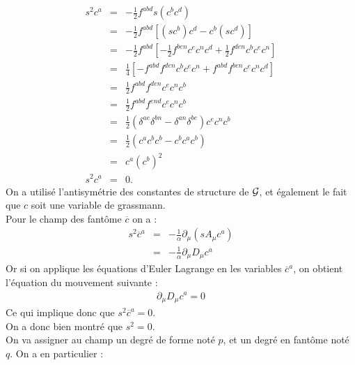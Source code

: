 \documentclass[a4paper,11pt]{article} %
\theoremstyle{plain}
\theoremstyle{definition}
\theoremstyle{remark}
\numberwithin{equation}{section}
\numberwithin{equation}{subsection}
\numberwithin{figure}{section}
\begin{document}
\begin{eqnarray*}
 s^2 c^{a} &=& - \frac{1}{2} f^{abd} s ( c^{b} c^{d} ) \\
                  &=& - \frac{1}{2} f^{abd} \left[ (s c^{b} ) c^{d}  - c^{b}  (s c^{d}) \right]\\
                  &=& - \frac{1}{2} f^{abd} \left[  - \frac{1}{2} f^{ben} c^{e}  c^{n}  c^{d} + \frac{1}{2} f^{den} c^{b}  c^{e}  c^{n}  \right]  \\
                  &=& \frac{1}{4} \left[  - f^{abd}  f^{den} c^{b}  c^{e}  c^{n}  +  f^{abd}  f^{ben} c^{e}  c^{n}  c^{d}   \right]\\
                  &=& \frac{1}{2}  f^{abd}  f^{den} c^{e}  c^{n}  c^{b} \\
                  &=& \frac{1}{2}  f^{abd}  f^{end} c^{e}  c^{n}  c^{b} \\
                  &=& \frac{1}{2}  \left(  \delta^{ae}  \delta^{bn} -  \delta^{an}  \delta^{be}  \right)  c^{e}  c^{n}  c^{b}  \\
                  &=& \frac{1}{2}  \left(  c^{a}  c^{b}  c^{b}  -  c^{b}  c^{a}  c^{b}  \right)  \\
                  &=& c^{a}  \left( c^{b}  \right)^{2}  \\
 s^2 c^{a} &=&0.
\end{eqnarray*}
On a utilisé l'antisymétrie des constantes de structure de $\cal{G}$, et également le fait que $c$ soit une variable de grassmann. \\
Pour le champ des fantôme $\overline{c}$ on a :
\begin{eqnarray*}
 s^2 \overline{c}^{a} &=& - \frac{1}{\alpha} \partial_{\mu} \left( s A_{\mu}c^{a} \right) \\
                                    &=& - \frac{1}{\alpha} \partial_{\mu} D_{\mu} c^{a}
\end{eqnarray*}
Or si on applique les équations d'Euler Lagrange en les variables $\overline{c}^{a}$, on obtient l'équation du mouvement suivante :
\begin{eqnarray*}
 \partial_{\mu} D_{\mu} c^{a} = 0
\end{eqnarray*}
Ce qui implique donc que $s^2 \overline{c}^{a} =0$.\\

\noindent
On a donc bien montré que $s^2 =0 $.\\

\noindent
On va assigner au champ un degré de forme noté $p$, et un degré en fantôme noté $q$. On a en particulier :
\end{document}
